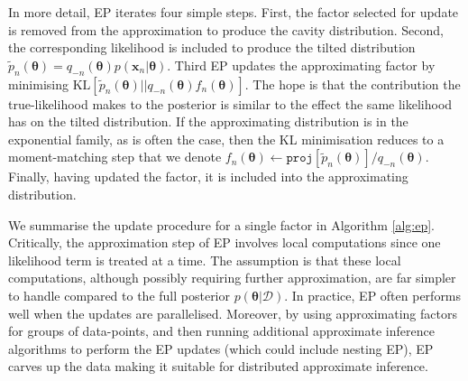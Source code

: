 In more detail, EP iterates four simple steps. First, the factor selected for update is removed from the approximation to produce the cavity distribution. Second, the corresponding likelihood is included to produce the tilted distribution $\tilde{p}_n(\bm{\theta}) = q_{-n}(\bm{\theta}) p(\bm{x}_n | \bm{\theta})$. Third EP updates the approximating factor by minimising $\mathrm{KL}[\tilde{p}_n(\bm{\theta}) || q_{-n}(\bm{\theta})  f_n(\bm{\theta})]$. The hope is that the contribution the true-likelihood makes to the posterior is similar to the effect the same likelihood has on the tilted distribution. If the approximating distribution is in the exponential family, as is often the case, then the KL minimisation reduces to a moment-matching step \cite{amari:ig} that we denote $f_n(\bm{\theta}) \leftarrow \mathtt{proj}[\tilde{p}_n(\bm{\theta})] / q_{-n}(\bm{\theta}) $. Finally, having updated the factor, it is included into the approximating distribution.
%
%
%
%
%

We summarise the update procedure for a single factor in Algorithm \ref{alg:ep}. Critically, the approximation step of EP involves local computations since one likelihood term is treated at a time. The assumption is that these local computations, although possibly requiring further approximation, are far simpler to handle compared to the full posterior $p(\bm{\theta}| \mathcal{D})$. In practice, EP often performs well when the updates are parallelised. Moreover, by using approximating factors for groups of data-points, and then running additional approximate inference algorithms to perform the EP updates (which could include nesting EP), EP carves up the data making it suitable for distributed approximate inference.

